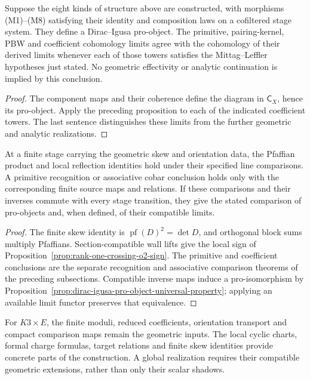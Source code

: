 \begin{theorem}
\label{thm:finite-stage-dirac-igusa-pro-object}
Suppose the eight kinds of structure above are constructed, with
morphisms \textup{(M1)}--\textup{(M8)} satisfying their identity and
composition laws on a cofiltered stage system. They define a
Dirac--Igusa pro-object. The primitive, pairing-kernel, PBW and
coefficient cohomology limits agree with the cohomology of their
derived limits whenever each of those towers satisfies the
Mittag--Leffler hypotheses just stated. No geometric effectivity or
analytic continuation is implied by this conclusion.
\end{theorem}
\begin{proof}
The component maps and their coherence define the diagram in
\(\mathsf C_X\), hence its pro-object. Apply the preceding
proposition to each of the indicated coefficient towers. The last
sentence distinguishes these limits from the further geometric and
analytic realizations.
\end{proof}

\begin{theorem}
\label{thm:pfaffian-dirac-finite-stage}
At a finite stage carrying the geometric skew and orientation data,
the Pfaffian product and local reflection identities hold under
their specified line comparisons. A primitive recognition or
associative cobar conclusion holds only with the corresponding
finite source maps and relations. If these comparisons and their
inverses commute with every stage transition, they give the stated
comparison of pro-objects and, when defined, of their compatible
limits.
\end{theorem}
\begin{proof}
The finite skew identity is
\(\operatorname{pf}(D)^2=\det D\), and orthogonal block sums
multiply Pfaffians. Section-compatible wall lifts give the local
sign of Proposition~\ref{prop:rank-one-crossing-o2-sign}.
The primitive and coefficient conclusions are the separate
recognition and associative comparison theorems of the preceding
subsections. Compatible inverse maps induce a pro-isomorphism by
Proposition~\ref{prop:dirac-igusa-pro-object-universal-property};
applying an available limit functor preserves that equivalence.
\end{proof}

For \(K3\times E\), the finite moduli, reduced coefficients,
orientation transport and compact comparison maps remain the
geometric inputs. The local cyclic charts, formal charge formulas,
target relations and finite skew identities provide concrete parts
of the construction. A global realization requires their compatible
geometric extensions, rather than only their scalar shadows.
